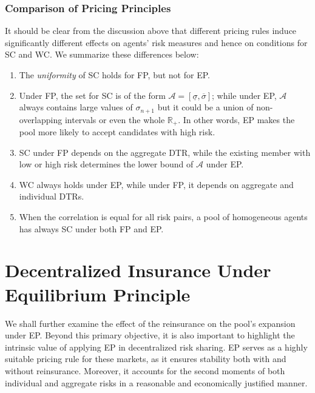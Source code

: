 \documentclass[fleqn,mnsc,nonblindrev]{informs4}
\begin{document}
\subsubsection*{Comparison of Pricing Principles}
It should be clear from the discussion above that different pricing rules induce significantly different effects on agents' risk measures and hence on conditions for SC and WC. We summarize these differences below:
\begin{enumerate}
\item The \textit{uniformity} of SC holds for FP, but not for EP.
\item  Under FP,   {the set for SC} is of the form $\mathcal{A}=[\underline{\sigma},\overline{\sigma}]$; while under EP, $\mathcal{A}$ always contains large values of $\sigma_{n+1}$ but it could be a union of non-overlapping intervals or even the whole $\mathbb{R}_+$. In other words, EP makes the pool more likely to accept candidates with high risk.
\item SC under FP depends on the aggregate DTR, while the existing member with low or high risk determines the lower bound of $\mathcal{A}$ under EP.
\item WC always holds under EP,   {while under FP,} it depends on aggregate and individual DTRs. 
\item When the correlation is equal for all risk pairs, a pool of homogeneous agents has always SC under both FP and EP.
\end{enumerate}

\section{Decentralized Insurance Under Equilibrium Principle}\label{sec:Equilibrium with Reinsurance}
We shall further    {examine} the effect of the reinsurance on the pool's expansion under EP.    {Beyond this primary objective, it is also important to highlight the intrinsic value of applying EP in decentralized risk sharing. EP serves as a highly suitable pricing rule for these markets, as it ensures stability both with and without reinsurance. Moreover, it accounts for the second moments of both individual and aggregate risks in a reasonable and economically justified manner.}
\end{document}
